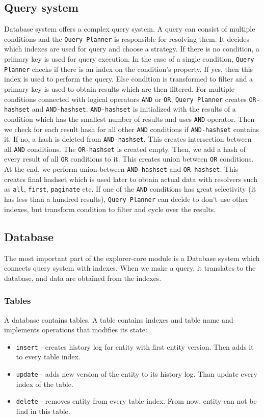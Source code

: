 \subsection{Query system}
Database system offers a complex query system. A query can consist of multiple conditions and the \texttt{Query Planner} is responsible for resolving them. It decides which indexes are used for query and choose a strategy. If there is no condition, a primary key is used for query execution. In the case of a single condition, \texttt{Query Planner} checks if there is an index on the condition's property. If yes, then this index is used to perform the query. Else condition is transformed to filter and a primary key is used to obtain results which are then filtered. For multiple conditions connected with logical operators \texttt{AND} or \texttt{OR}, \texttt{Query Planner} creates \texttt{OR-hashset} and \texttt{AND-hashset}. \texttt{AND-hashset} is initialized with the results of a condition which has the smallest number of results and uses \texttt{AND} operator. Then we check for each result hash for all other \texttt{AND} conditions if \texttt{AND-hashset} contains it. If no, a hash is deleted from \texttt{AND-hashset}. This creates intersection between all \texttt{AND} conditions. The \texttt{OR-hashset} is created empty. Then, we add a hash of every result of all \texttt{OR} conditions to it. This creates union between \texttt{OR} conditions. At the end, we perform union between \texttt{AND-hashset} and \texttt{OR-hashset}. This creates final hashset which is used later to obtain actual data with resolvers such as \texttt{all}, \texttt{first}, \texttt{paginate} etc. If one of the \texttt{AND} conditions has great selectivity (it has less than a hundred results), \texttt{Query Planner} can decide to don't use other indexes, but transform condition to filter and cycle over the results.

\subsection{Database}
The most important part of the explorer-core module is a Database system which connects query system with indexes. When we make a query, it translates to the database, and data are obtained from the indexes.

\subsubsection{Tables}
A database contains tables. A table contains indexes and table name and implements operations that modifies its state:
\begin{itemize}
    \item \texttt{insert} - creates history log for entity with first entity version. Then adds it to every table index.
    \item \texttt{update} - adds new version of the entity to its history log. Than update every index of the table.
    \item \texttt{delete} - removes entity from every table index. From now, entity can not be find in this table.
\end{itemize}


